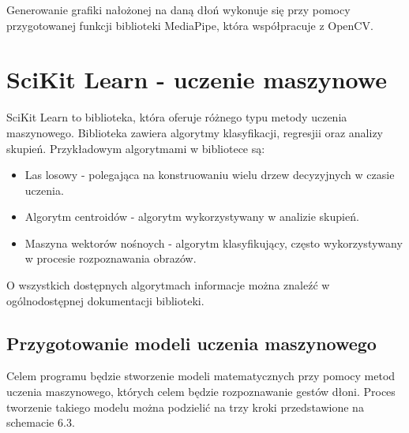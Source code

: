     \quad Generowanie grafiki nałożonej na daną dłoń wykonuje się przy pomocy przygotowanej funkcji biblioteki MediaPipe, która współpracuje z OpenCV.   
    
    
    
    \section{SciKit Learn - uczenie maszynowe}
    
    \quad SciKit Learn to biblioteka, która oferuje różnego typu metody uczenia maszynowego. Biblioteka zawiera algorytmy klasyfikacji, regresjii oraz analizy skupień. Przykładowym algorytmami w bibliotece są:
    \begin{itemize}
        \item Las losowy - polegająca na konstruowaniu wielu drzew decyzyjnych w czasie uczenia. 
        \item Algorytm centroidów - algorytm wykorzystywany w analizie skupień.
        \item Maszyna wektorów nośnoych - algorytm klasyfikujący, często wykorzystywany w procesie rozpoznawania obrazów. 
    \end{itemize}
    O wszystkich dostępnych algorytmach informacje można znaleźć w ogólnodostępnej dokumentacji biblioteki. 
    
    \subsection{Przygotowanie modeli uczenia maszynowego}
    \quad Celem programu będzie stworzenie modeli matematycznych przy pomocy metod uczenia maszynowego, których celem będzie rozpoznawanie gestów dłoni. Proces tworzenie takiego modelu można podzielić na trzy kroki przedstawione na schemacie 6.3. 

